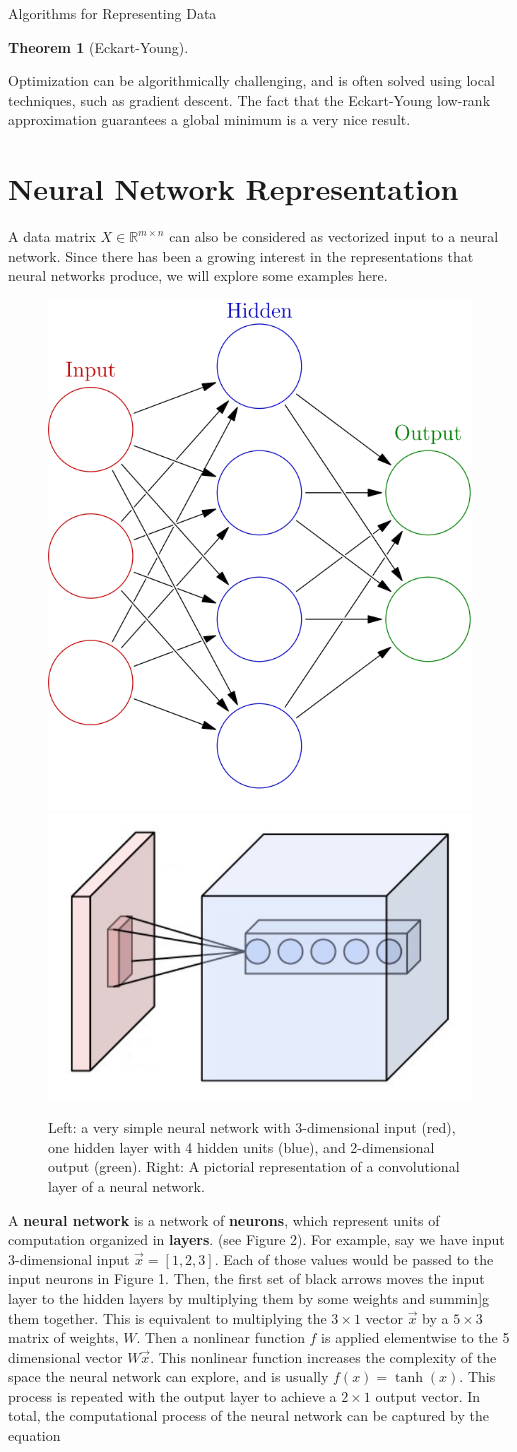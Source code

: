 \documentclass[12pt]{pom_thesis}
\newtheorem{theorem}{Theorem}
\begin{document}
\begin{chapter}{Algorithms for Representing Data}
\begin{theorem}[Eckart-Young]
\end{theorem}
Optimization can be algorithmically challenging, and is often solved using local techniques, such as gradient descent. The fact that the Eckart-Young low-rank approximation guarantees a global minimum is a very nice result.


\section{Neural Network Representation}
\label{NN}
A data matrix $X \in \mathbb{R}^{m \times n}$ can also be considered as vectorized input to a neural network. Since there has been a growing interest in the representations that neural networks produce, we will explore some examples here.  
\begin{figure}[h]
	\centering
	\includegraphics[width=.3\textwidth]{nn}
	\includegraphics[width=.5\textwidth]{Conv_layer}
	\caption{Left: a very simple neural network with 3-dimensional input (red),  one hidden layer with 4 hidden units (blue),  and 2-dimensional output (green). Right: A pictorial representation of a convolutional layer of a neural network.}
\end{figure}
A \textbf{neural network} is a network of \textbf{neurons}, which represent units of computation organized in \textbf{layers}. (see Figure 2). For example, say we have input 3-dimensional input $\vec{x} = [1,2,3] $. Each of those values would be passed to the input neurons in Figure 1. Then, the first set of black arrows moves the input layer to the hidden layers by multiplying them by some weights and summin]g them together. This is equivalent to multiplying the $3 \times 1$ vector $\vec{x}$ by a $5 \times 3$ matrix of weights, $W$. Then a nonlinear function $f$ is applied elementwise to the 5 dimensional vector $W\vec{x}$. This nonlinear function increases the complexity of the space the neural network can explore, and is usually $f(x) = \tanh(x)$. This process is repeated with the output layer to achieve a $2\times 1$ output vector. In total, the computational process of the neural network can be captured by the equation

\end{chapter}
\end{document}
